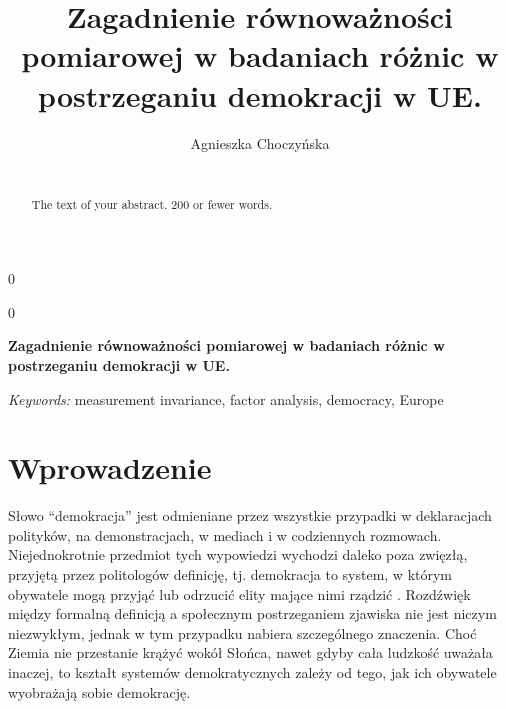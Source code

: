 \documentclass[12pt]{article}
\newcommand{\blind}{0}
\begin{document}
\def\spacingset#1{\renewcommand{\baselinestretch}%
{#1}\small\normalsize} \spacingset{1}



\blind
{
  \title{\bf Zagadnienie równoważności pomiarowej w badaniach różnic w postrzeganiu demokracji w UE.}

  \author{
        Agnieszka Choczyńska \\
    \\
      }
  \maketitle
} \fi

\blind
{
  \bigskip
  \bigskip
  \bigskip
  \begin{center}
    {\LARGE\bf Zagadnienie równoważności pomiarowej w badaniach różnic w postrzeganiu demokracji w UE.}
  \end{center}
  \medskip
} \fi

\bigskip
\begin{abstract}
The text of your abstract. 200 or fewer words.
\end{abstract}

\noindent%
{\it Keywords:} measurement invariance, factor analysis, democracy, Europe
\vfill

\newpage
\spacingset{1.45} %

\hypertarget{wprowadzenie}{%
\section*{Wprowadzenie}\label{wprowadzenie}}

Słowo ``demokracja'' jest odmieniane przez wszystkie przypadki w deklaracjach polityków, na demonstracjach, w mediach i w codziennych rozmowach. Niejednokrotnie przedmiot tych wypowiedzi wychodzi daleko poza zwięzłą, przyjętą przez politologów definicję, tj. demokracja to system, w którym obywatele mogą przyjąć lub odrzucić elity mające nimi rządzić \citep{Schumpeter}. Rozdźwięk między formalną definicją a społecznym postrzeganiem zjawiska nie jest niczym niezwykłym, jednak w tym przypadku nabiera szczególnego znaczenia. Choć Ziemia nie przestanie krążyć wokół Słońca, nawet gdyby cała ludzkość uważała inaczej, to kształt systemów demokratycznych zależy od tego, jak ich obywatele wyobrażają sobie demokrację.
\end{document}
